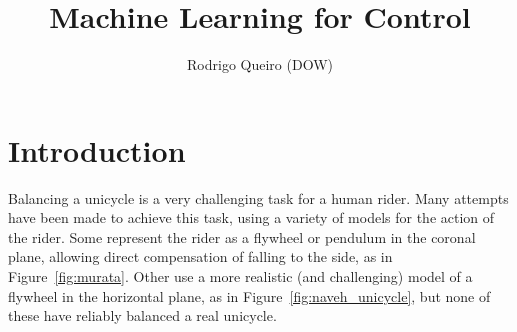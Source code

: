 \documentclass{IIBproject}
\begin{document}
\author{Rodrigo Queiro (DOW)}
\title{Machine Learning for Control}
\maketitle
\thispagestyle{empty}

\renewcommand{\abstractname}{Technical Abstract}
\begin{abstract}



\end{abstract}
\pagestyle{plain}
\tableofcontents
\newpage

\section{Introduction}

Balancing a unicycle is a very challenging task for a
human rider. Many attempts have been made to achieve this task, using a
variety of models for the action of the rider. Some represent the rider as a
flywheel or pendulum in the coronal plane, allowing direct compensation of
falling to the side\cite{ref:zenkov,ref:murata}, as in
Figure~\ref{fig:murata}. Other use a more realistic (and challenging) model of
a flywheel in the horizontal plane\cite{ref:vos,ref:naveh}, as in
Figure~\ref{fig:naveh_unicycle}, but none of these
have reliably balanced a real unicycle.
\end{document}
